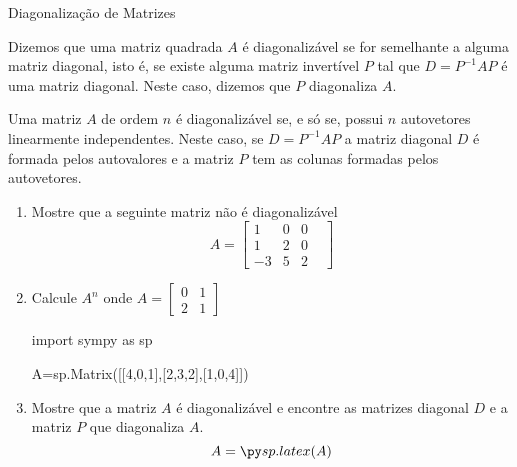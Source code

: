 \begin{frame}[label=autovalores]{Diagonalização de Matrizes}
\begin{defin}
Dizemos que uma matriz quadrada $A$ é {\color{blue}diagonalizável} se for semelhante a alguma matriz diagonal, isto é, se existe alguma matriz invertível $P$ tal que $D=P^{-1}AP$ é uma matriz diagonal. Neste caso, dizemos que $P$ {\color{blue}diagonaliza } $A$.
\end{defin}

\begin{teo}
Uma matriz $A$ de ordem $n$ é diagonalizável se, e só se, possui $n$ autovetores linearmente independentes. Neste caso, se $D=P^{-1}AP$ a matriz diagonal $D$ é formada pelos autovalores e a matriz $P$ tem as colunas formadas pelos autovetores.
\end{teo}

\end{frame}

\begin{frame}[label=autovalores,fragile=singleslide]{}
\begin{exe}
\begin{enumerate}
\item Mostre que a seguinte matriz não é diagonalizável
\[
A=\begin{bmatrix}
1& 0 & 0& \\ 1 & 2 & 0\\ -3 & 5 &  2
\end{bmatrix}
\]

\item Calcule $A^n$ onde $A=\begin{bmatrix}
0 & 1 \\ 2 & 1
\end{bmatrix}$

\begin{pycode}
import sympy as sp

A=sp.Matrix([[4,0,1],[2,3,2],[1,0,4]])
\end{pycode}

\item Mostre que a matriz $A$ é diagonalizável e encontre as matrizes diagonal $D$ e a matriz $P$ que diagonaliza $A$.
\[
A=\pyl{A}
\]
\end{enumerate}

\end{exe}

\end{frame}


